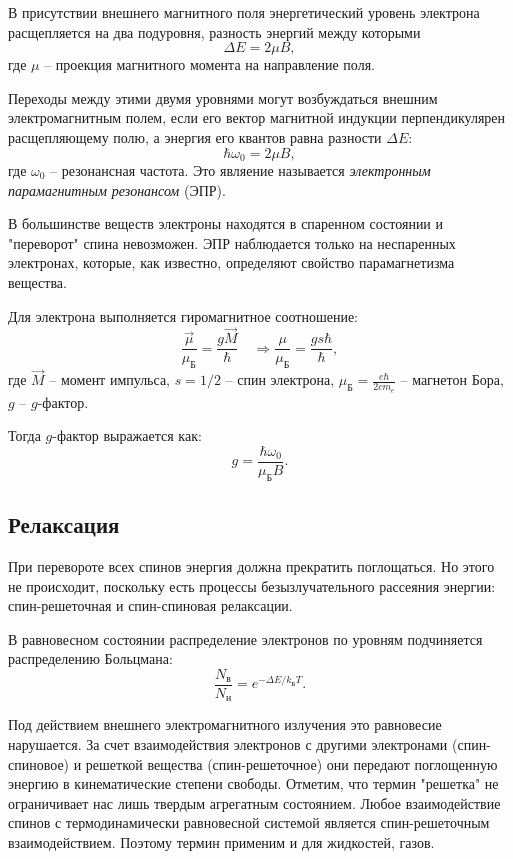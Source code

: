\documentclass[12pt,a4paper]{article}
\begin{document}
	В присутствии внешнего магнитного поля энергетический уровень электрона расщепляется на два подуровня, разность энергий между которыми
	$$ \Delta E = 2 \mu B, $$
	где $\mu$ -- проекция магнитного момента на направление поля.

	Переходы между этими двумя уровнями могут возбуждаться внешним электромагнитным полем, если его вектор магнитной индукции перпендикулярен расщепляющему полю, а энергия его квантов равна разности $\Delta E$:
	\begin{equation}
		\hbar \omega_0 = 2 \mu B,
		\label{eq:frequency}
	\end{equation}
	где $\omega_0$ -- резонансная частота. Это являение называется \textit{электронным парамагнитным резонансом} (ЭПР).
	
	В большинстве веществ электроны находятся в спаренном состоянии и "переворот" спина невозможен. ЭПР наблюдается только на неспаренных электронах, которые, как известно, определяют свойство парамагнетизма вещества.
	
	Для электрона выполняется гиромагнитное соотношение:
	\begin{equation}
		\frac{\vec{\mu}}{\mu_{\text{Б}}} = \frac{g \vec{M}}{\hbar} \quad \Rightarrow \frac{\mu}{\mu_{\text{Б}}} = \frac{g s \hbar}{\hbar},
	\end{equation}
	где $\vec{M}$ -- момент импульса, $s = 1/2$ -- спин электрона, $\mu_{\text{Б}} = \frac{e \hbar}{2 c m_e}$ -- магнетон Бора, $g$ -- $g$-фактор.
	
	Тогда $g$-фактор выражается как:
	\begin{equation}
		g = \frac{\hbar \omega_0}{\mu_{\text{Б}} B}.
		\label{eq:g_factor}
	\end{equation}
	
	\subsection*{Релаксация}
	При перевороте всех спинов энергия должна прекратить поглощаться. Но этого не происходит, поскольку есть процессы безызлучательного рассеяния энергии: спин-решеточная и спин-спиновая релаксации.
	
	В равновесном состоянии распределение электронов по уровням подчиняется распределению Больцмана:
	$$ \frac{N_{\text{в}}}{N_{\text{н}}} = e^{- \Delta E / k_{\text{Б}} T}. $$
	
	Под действием внешнего электромагнитного излучения это равновесие нарушается. За счет взаимодействия электронов с другими электронами (спин-спиновое) и решеткой вещества (спин-решеточное) они передают поглощенную энергию в кинематические степени свободы.
	Отметим, что термин "решетка" не ограничивает нас лишь твердым агрегатным состоянием. Любое взаимодействие спинов с термодинамически равновесной системой является спин-решеточным взаимодействием. Поэтому термин применим и для жидкостей, газов.
	
\end{document}
